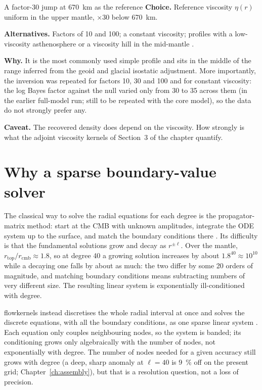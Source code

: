 \begin{decision}{A factor-30 jump at \qty{670}{km} as the reference}
\textbf{Choice.} Reference viscosity $\eta(r)$ uniform in the upper mantle, $\times 30$ below \qty{670}{km}.

\textbf{Alternatives.} Factors of 10 and 100; a constant viscosity; profiles with a low-viscosity asthenosphere or a viscosity hill in the mid-mantle \citep{rudolph_2015}.

\textbf{Why.} It is the most commonly used simple profile and sits in the middle of the range inferred from the geoid and glacial isostatic adjustment.
More importantly, the inversion was repeated for factors 10, 30 and 100 and for constant viscosity: the log Bayes factor against the null varied only from 30 to 35 across them (in the earlier full-model run; still to be repeated with the core model), so the data do not strongly prefer any.

\textbf{Caveat.} The recovered density does depend on the viscosity.
How strongly is what the adjoint viscosity kernels of Section~3 of the chapter quantify.
\end{decision}

\section{Why a sparse boundary-value solver}

The classical way to solve the radial equations for each degree is the propagator-matrix method: start at the CMB with unknown amplitudes, integrate the ODE system up to the surface, and match the boundary conditions there \citep{hager_lower_1985,corrieu_mantle_1995}.
Its difficulty is that the fundamental solutions grow and decay as $r^{\pm\ell}$.
Over the mantle, $r_{\mathrm{top}}/r_{\mathrm{cmb}} \approx 1.8$, so at degree 40 a growing solution increases by about $1.8^{40}\approx 10^{10}$ while a decaying one falls by about as much: the two differ by some 20 orders of magnitude, and matching boundary conditions means subtracting numbers of very different size.
The resulting linear system is exponentially ill-conditioned with degree.

flowkernels instead discretises the whole radial interval at once and solves the discrete equations, with all the boundary conditions, as one sparse linear system \citep{ascher_bvp_1995}.
Each equation only couples neighbouring nodes, so the system is banded; its conditioning grows only algebraically with the number of nodes, not exponentially with degree. The number of nodes needed for a given accuracy still grows with degree (a deep, sharp anomaly at $\ell=40$ is \qty{9}{\percent} off on the present grid; Chapter~\ref{ch:assembly}), but that is a resolution question, not a loss of precision.

